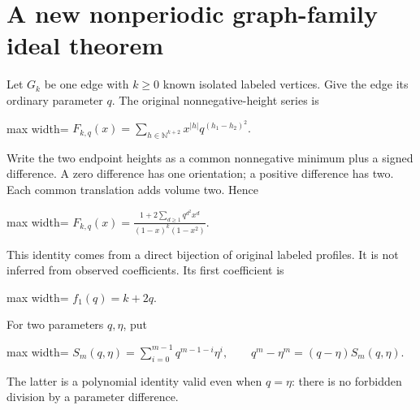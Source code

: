 \documentclass[
  11pt,
  a4paper,
]{report}
\begin{document}
\hypertarget{a-new-nonperiodic-graph-family-ideal-theorem}{%
\section{A new nonperiodic graph-family ideal
theorem}\label{a-new-nonperiodic-graph-family-ideal-theorem}}

Let \(G_k\) be one edge with \(k\ge0\) known isolated labeled vertices.
Give the edge its ordinary parameter \(q\). The original
nonnegative-height series is \begin{center}
\begin{adjustbox}{max width=\linewidth}
$\displaystyle
 F_{k,q}(x)=\sum_{h\in\mathbb N^{k+2}}x^{|h|}q^{(h_1-h_2)^2}.
$
\end{adjustbox}
\end{center} Write the two endpoint heights as a common nonnegative minimum plus a
signed difference. A zero difference has one orientation; a positive
difference has two. Each common translation adds volume two. Hence \begin{center}
\begin{adjustbox}{max width=\linewidth}
$\displaystyle
 F_{k,q}(x)=\frac{1+2\sum_{d\ge1}q^{d^2}x^d}{(1-x)^k(1-x^2)}.
$
\end{adjustbox}
\end{center} This identity comes from a direct bijection of original labeled
profiles. It is not inferred from observed coefficients. Its first
coefficient is \begin{center}
\begin{adjustbox}{max width=\linewidth}
$\displaystyle
 f_1(q)=k+2q.
$
\end{adjustbox}
\end{center} For two parameters \(q,\eta\), put \begin{center}
\begin{adjustbox}{max width=\linewidth}
$\displaystyle
 S_m(q,\eta)=\sum_{i=0}^{m-1}q^{m-1-i}\eta^i,
 \qquad q^m-\eta^m=(q-\eta)S_m(q,\eta).
$
\end{adjustbox}
\end{center} The latter is a polynomial identity valid even when \(q=\eta\): there
is no forbidden division by a parameter difference.
\end{document}
